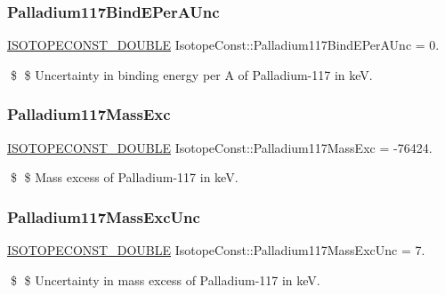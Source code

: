 \subsubsection{\texorpdfstring{Palladium117\+Bind\+E\+Per\+A\+Unc}{Palladium117BindEPerAUnc}}
{\footnotesize\ttfamily \mbox{\hyperlink{group___isotope_const-_macros_ga8f45a7272ce02c0b4c65c44636ed719a}{I\+S\+O\+T\+O\+P\+E\+C\+O\+N\+S\+T\+\_\+\+D\+O\+U\+B\+LE}} Isotope\+Const\+::\+Palladium117\+Bind\+E\+Per\+A\+Unc = 0.}

\$ \$ Uncertainty in binding energy per A of Palladium-\/117 in keV. \mbox{\label{group___isotope_const-_palladium-_pd117_gaec0fb16134f7fd0bb60e575cb08b19bd}} 
\subsubsection{\texorpdfstring{Palladium117\+Mass\+Exc}{Palladium117MassExc}}
{\footnotesize\ttfamily \mbox{\hyperlink{group___isotope_const-_macros_ga8f45a7272ce02c0b4c65c44636ed719a}{I\+S\+O\+T\+O\+P\+E\+C\+O\+N\+S\+T\+\_\+\+D\+O\+U\+B\+LE}} Isotope\+Const\+::\+Palladium117\+Mass\+Exc = -\/76424.}

\$ \$ Mass excess of Palladium-\/117 in keV. \mbox{\label{group___isotope_const-_palladium-_pd117_ga8e82933d95f0297c894fa8fab7170689}} 
\subsubsection{\texorpdfstring{Palladium117\+Mass\+Exc\+Unc}{Palladium117MassExcUnc}}
{\footnotesize\ttfamily \mbox{\hyperlink{group___isotope_const-_macros_ga8f45a7272ce02c0b4c65c44636ed719a}{I\+S\+O\+T\+O\+P\+E\+C\+O\+N\+S\+T\+\_\+\+D\+O\+U\+B\+LE}} Isotope\+Const\+::\+Palladium117\+Mass\+Exc\+Unc = 7.}

\$ \$ Uncertainty in mass excess of Palladium-\/117 in keV. \mbox{\label{group___isotope_const-_palladium-_pd117_ga0394497ed992a09520652ba751bb47e7}} 
